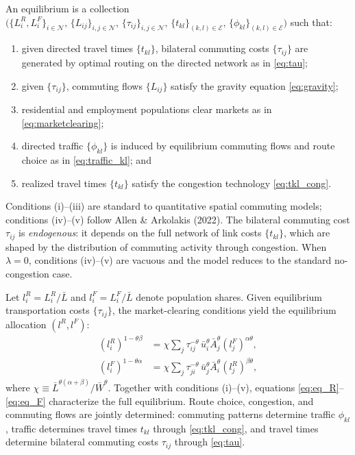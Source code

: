 \documentclass[12pt]{article}
\begin{document}
	An equilibrium is a collection
	$\bigl(\{L_i^R,L_i^F\}_{i\in\mathcal N},\,\{L_{ij}\}_{i,j\in\mathcal N},\,\{\tau_{ij}\}_{i,j\in\mathcal N},\,\{t_{kl}\}_{(k,l)\in\mathcal E},\,\{\phi_{kl}\}_{(k,l)\in\mathcal E}\bigr)$
	such that:
	\begin{enumerate}[label=(\roman*)]
		\item given directed travel times $\{t_{kl}\}$, bilateral commuting costs $\{\tau_{ij}\}$ are generated by optimal routing on the directed network as in \eqref{eq:tau};
		\item given $\{\tau_{ij}\}$, commuting flows $\{L_{ij}\}$ satisfy the gravity equation \eqref{eq:gravity};
		\item residential and employment populations clear markets as in \eqref{eq:marketclearing};
		\item directed traffic $\{\phi_{kl}\}$ is induced by equilibrium commuting flows and route choice as in \eqref{eq:traffic_kl}; and
		\item realized travel times $\{t_{kl}\}$ satisfy the congestion technology \eqref{eq:tkl_cong}.
	\end{enumerate}
	Conditions (i)--(iii) are standard to quantitative spatial commuting models; conditions (iv)--(v) follow Allen \& Arkolakis (2022). The bilateral commuting cost $\tau_{ij}$ is \emph{endogenous}: it depends on the full network of link costs $\{t_{kl}\}$, which are shaped by the distribution of commuting activity through congestion. When $\lambda=0$, conditions (iv)--(v) are vacuous and the model reduces to the standard no-congestion case.

	Let $l_i^R=L_i^R/\bar L$ and $l_i^F=L_i^F/\bar L$ denote population shares. Given equilibrium transportation costs $\{\tau_{ij}\}$, the market-clearing conditions yield the equilibrium allocation $(l^R,l^F)$:
	\begin{align}
		(l_i^R)^{1-\theta\beta} &= \chi \sum_j \tau_{ij}^{-\theta}\,\bar u_i^\theta \bar A_j^\theta (l_j^F)^{\alpha\theta}, \label{eq:eq_R}\\
		(l_i^F)^{1-\theta\alpha} &= \chi \sum_j \tau_{ji}^{-\theta}\,\bar u_j^\theta \bar A_i^\theta (l_j^R)^{\beta\theta}, \label{eq:eq_F}
	\end{align}
	where $\chi\equiv \bar L^{\theta(\alpha+\beta)}/\bar W^{\theta}$. Together with conditions (i)--(v), equations \eqref{eq:eq_R}--\eqref{eq:eq_F} characterize the full equilibrium. Route choice, congestion, and commuting flows are jointly determined: commuting patterns determine traffic $\phi_{kl}$, traffic determines travel times $t_{kl}$ through \eqref{eq:tkl_cong}, and travel times determine bilateral commuting costs $\tau_{ij}$ through \eqref{eq:tau}.
\end{document}
